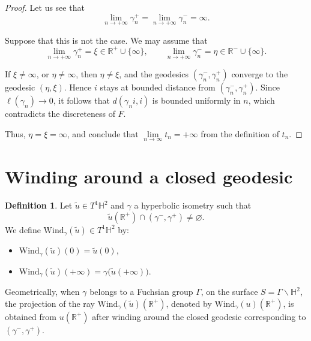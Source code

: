 \documentclass[a4paper,english,reqno]{amsart}
\renewcommand{\H}{\mathbb{H}}
\newcommand{\N}{\mathbb{N}} %
\theoremstyle{definition}
\newtheorem{definition}[theorem]{Definition}
\numberwithin{equation}{section}
\begin{document}
	\begin{proof}

Let us see that
\[
\lim\limits_{n\to+\infty}\gamma_n^+=\lim\limits_{n\to+\infty}\gamma_n^-=\infty.
\]

Suppose that this is not the case. We may assume that
\[
\lim\limits_{n\to+\infty}\gamma_n^+=\xi\in\mathbb R^+\cup\{\infty\},
\qquad
\lim\limits_{n\to+\infty}\gamma_n^-=\eta\in\mathbb R^-\cup\{\infty\}.
\]


\medskip

\noindent
If $\xi\neq \infty$, or $\eta\neq \infty$,
then $\eta\neq \xi$, and the geodesics $(\gamma_n^-,\gamma_n^+)$ converge to the geodesic $(\eta,\xi)$.
Hence $i$ stays at bounded distance from $(\gamma_n^-,\gamma_n^+)$.
Since $\ell(\gamma_n)\to 0$, it follows that
$
d(\gamma_n i,i)
$ is bounded uniformly in $n$, which contradicts the discreteness of $F$.


Thus, $\eta=\xi=\infty$, and conclude that $\lim\limits_{n\to \infty} t_n=+\infty$ from the definition of $t_n$.
	\end{proof}	




\section{Winding around a closed geodesic}

\begin{definition}
	Let $\tilde{u}\in T^{1}\mathbb{H}^{2}$ and $\gamma$ a hyperbolic isometry such that
	\[
	\tilde{u}(\mathbb{R}^{+})\cap (\gamma^{-},\gamma^{+})\neq \varnothing.
	\]
	We define $\mathrm{Wind}_{\gamma}(\tilde{u})\in T^{1}\mathbb{H}^{2}$ by:
	\begin{itemize}
		\item $\mathrm{Wind}_{\gamma}(\tilde {u})(0)=\tilde{u}(0)$,
		\item $\mathrm{Wind}_{\gamma}(\tilde{u})(+\infty)=\gamma\bigl(\tilde{u}(+\infty)\bigr)$.
	\end{itemize}
\end{definition}

	Geometrically, when $\gamma$ belongs to a Fuchsian group $\Gamma$, on the surface  $S=\Gamma \backslash\H^2$, the projection of the ray $\mathrm{Wind}_{\gamma}(\tilde{u})(\mathbb{R}^{+})$, denoted by $\mathrm{Wind}_{\gamma}(u)(\mathbb{R}^{+})$, 
is obtained from ${u}(\mathbb{R}^{+})$ after winding around the closed geodesic
corresponding to $(\gamma^{-},\gamma^{+})$. %
 
\end{document}
